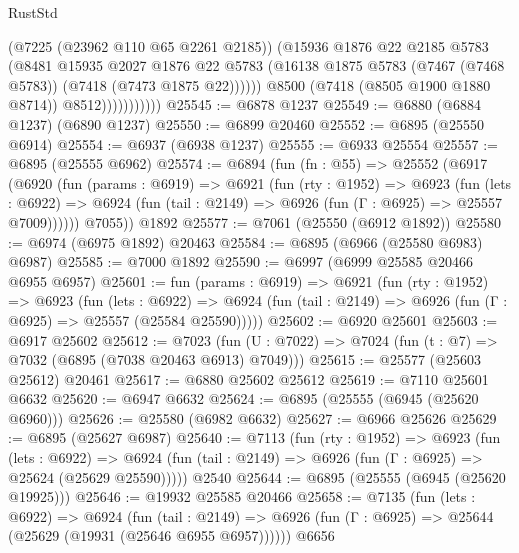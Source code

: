 \begin{lexlean}{RustStd}
\begin{coremodule}
                            (@7225 (@23962 @110 @65 @2261 @2185))
                            (@15936
                              @1876
                              @22
                              @2185
                              @5783
                              (@8481
                                @15935
                                @2027
                                @1876
                                @22
                                @5783
                                (@16138
                                  @1875
                                  @5783
                                  (@7467 (@7468 @5783))
                                  (@7418 (@7473 @1875 @22))))))
                          @8500
                          (@7418 (@8505 @1900 @1880 @8714))
                          @8512)))))))))))
@25545 := @6878 @1237
@25549 := @6880 (@6884 @1237) (@6890 @1237)
@25550 := @6899 @20460
@25552 := @6895 (@25550 @6914)
@25554 := @6937 (@6938 @1237)
@25555 := @6933 @25554
@25557 := @6895 (@25555 @6962)
@25574 := @6894
    (fun (fn : @55) =>
    @25552
      (@6917
        (@6920
          (fun (params : @6919) =>
          @6921
            (fun (rty : @1952) =>
            @6923
              (fun (lets : @6922) =>
              @6924 (fun (tail : @2149) => @6926 (fun (Γ : @6925) => @25557 @7009))))))
        @7055))
    @1892
@25577 := @7061 (@25550 (@6912 @1892))
@25580 := @6974 (@6975 @1892) @20463
@25584 := @6895 (@6966 (@25580 @6983) @6987)
@25585 := @7000 @1892
@25590 := @6997 (@6999 @25585 @20466 @6955 @6957)
@25601 := fun (params : @6919) =>
  @6921
    (fun (rty : @1952) =>
    @6923
      (fun (lets : @6922) =>
      @6924 (fun (tail : @2149) => @6926 (fun (Γ : @6925) => @25557 (@25584 @25590)))))
@25602 := @6920 @25601
@25603 := @6917 @25602
@25612 := @7023
    (fun (U : @7022) => @7024 (fun (t : @7) => @7032 (@6895 (@7038 @20463 @6913) @7049)))
@25615 := @25577 (@25603 @25612) @20461
@25617 := @6880 @25602 @25612
@25619 := @7110 @25601 @6632
@25620 := @6947 @6632
@25624 := @6895 (@25555 (@6945 (@25620 @6960)))
@25626 := @25580 (@6982 @6632)
@25627 := @6966 @25626
@25629 := @6895 (@25627 @6987)
@25640 := @7113
    (fun (rty : @1952) =>
    @6923
      (fun (lets : @6922) =>
      @6924 (fun (tail : @2149) => @6926 (fun (Γ : @6925) => @25624 (@25629 @25590)))))
    @2540
@25644 := @6895 (@25555 (@6945 (@25620 @19925)))
@25646 := @19932 @25585 @20466
@25658 := @7135
    (fun (lets : @6922) =>
    @6924
      (fun (tail : @2149) =>
      @6926 (fun (Γ : @6925) => @25644 (@25629 (@19931 (@25646 @6955 @6957))))))
    @6656

\end{coremodule}
\end{lexlean}
